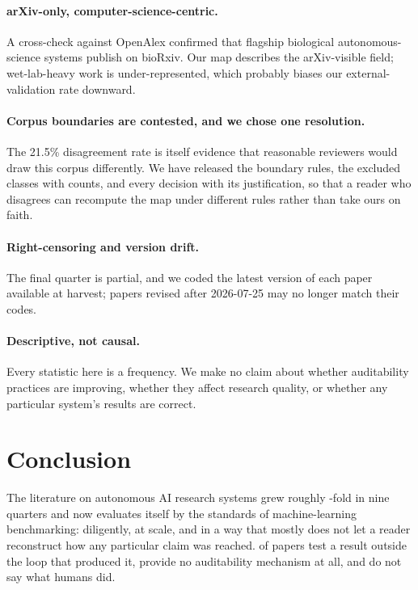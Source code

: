 \paragraph{arXiv-only, computer-science-centric.} A cross-check against OpenAlex confirmed
that flagship biological autonomous-science systems publish on bioRxiv. Our map describes the
arXiv-visible field; wet-lab-heavy work is under-represented, which probably biases our
external-validation rate downward.

\paragraph{Corpus boundaries are contested, and we chose one resolution.} The 21.5\%
disagreement rate is itself evidence that reasonable reviewers would draw this corpus
differently. We have released the boundary rules, the excluded classes with counts, and every
decision with its justification, so that a reader who disagrees can recompute the map under
different rules rather than take ours on faith.

\paragraph{Right-censoring and version drift.} The final quarter is partial, and we coded the
latest version of each paper available at harvest; papers revised after 2026-07-25 may no
longer match their codes.

\paragraph{Descriptive, not causal.} Every statistic here is a frequency. We make no claim
about whether auditability practices are improving, whether they affect research quality, or
whether any particular system's results are correct.

\section{Conclusion}

The literature on autonomous AI research systems grew roughly \growthFactor{}-fold in nine
quarters and now evaluates itself by the standards of machine-learning benchmarking:
diligently, at scale, and in a way that mostly does not let a reader reconstruct how any
particular claim was reached. \pctHeldOut{} of papers test a result outside the loop that
produced it, \pctAuditNone{} provide no auditability mechanism at all, and \pctHumanUnspec{}
do not say what humans did.

